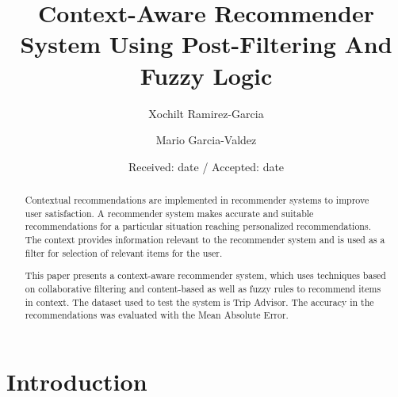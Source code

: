 \providecommand\foo{}
\renewcommand\foo{...}


\title{Context-Aware Recommender System Using Post-Filtering And Fuzzy Logic
}
\subtitle{}


\author{Xochilt Ramirez-Garcia \and Mario Garcia-Valdez %
}



\date{Received: date / Accepted: date}

\maketitle

\begin{abstract} 
Contextual recommendations are implemented in recommender systems to improve
user satisfaction. A recommender system makes accurate and suitable
recommendations for a particular situation reaching personalized
recommendations.
The context provides information relevant to the recommender
system and is used as a filter for selection of relevant items for the user.

This paper presents a context-aware recommender system, which uses techniques
based on collaborative filtering and content-based as well as fuzzy rules to
recommend items in context. The dataset used to test the system is Trip Advisor.
The accuracy in the recommendations was evaluated with the Mean Absolute Error.

\end{abstract}

\section{Introduction} \label{intro} 

